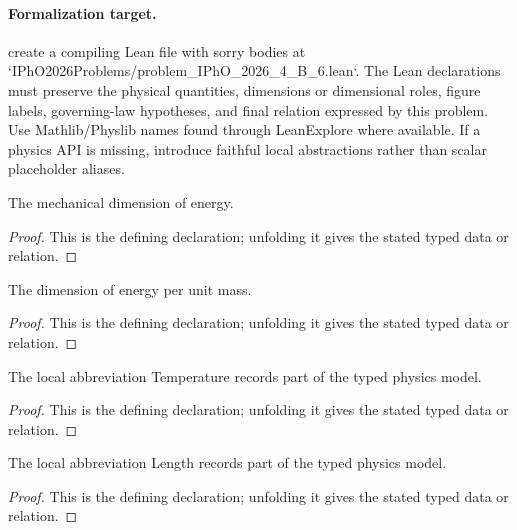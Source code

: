 \paragraph{Formalization target.}
create a compiling Lean file with sorry bodies at `IPhO2026Problems/problem\_IPhO\_2026\_4\_B\_6.lean`. The Lean declarations must preserve the physical quantities, dimensions or dimensional roles, figure labels, governing-law hypotheses, and final relation expressed by this problem.
Use Mathlib/Physlib names found through LeanExplore where available. If a physics API is missing, introduce faithful local abstractions rather than scalar placeholder aliases.

\begin{definition}[energyDimension]
  \label{decl:physics:IPhO_2026_4_B_6:energyDimension}
  The mechanical dimension of energy.
\end{definition}
\begin{proof}
  This is the defining declaration; unfolding it gives the stated typed data or relation.
\end{proof}

\begin{definition}[specificEnergyDimension]
  \label{decl:physics:IPhO_2026_4_B_6:specificEnergyDimension}
  The dimension of energy per unit mass.
\end{definition}
\begin{proof}
  This is the defining declaration; unfolding it gives the stated typed data or relation.
\end{proof}

\begin{definition}[Temperature]
  \label{decl:physics:IPhO_2026_4_B_6:Temperature}
  The local abbreviation Temperature records part of the typed physics model.
\end{definition}
\begin{proof}
  This is the defining declaration; unfolding it gives the stated typed data or relation.
\end{proof}

\begin{definition}[Length]
  \label{decl:physics:IPhO_2026_4_B_6:Length}
  The local abbreviation Length records part of the typed physics model.
\end{definition}
\begin{proof}
  This is the defining declaration; unfolding it gives the stated typed data or relation.
\end{proof}

